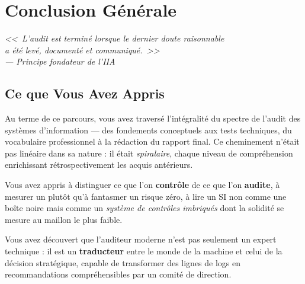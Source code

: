 
\chapter*{Conclusion Générale}\label{chap:conclusion}

\begin{flushright}
    \itshape
    <<~L'audit est terminé lorsque le dernier doute raisonnable\\
    a été levé, documenté et communiqué.~>>\\[0.5ex]
    \small--- Principe fondateur de l'IIA
\end{flushright}

\vspace{1.5ex}

\section*{Ce que Vous Avez Appris}

Au terme de ce parcours, vous avez traversé l'intégralité du spectre de l'audit des systèmes d'information — des fondements conceptuels aux tests techniques, du vocabulaire professionnel à la rédaction du rapport final. Ce cheminement n'était pas linéaire dans sa nature : il était \textit{spiralaire}, chaque niveau de compréhension enrichissant rétrospectivement les acquis antérieurs.

Vous avez appris à distinguer ce que l'on \textbf{contrôle} de ce que l'on \textbf{audite}, à mesurer un  plutôt qu'à fantasmer un risque zéro, à lire un SI non comme une boîte noire mais comme un \textit{système de contrôles imbriqués} dont la solidité se mesure au maillon le plus faible.

Vous avez découvert que l'auditeur moderne n'est pas seulement un expert technique : il est un \textbf{traducteur} entre le monde de la machine et celui de la décision stratégique, capable de transformer des lignes de logs en recommandations compréhensibles par un comité de direction.

